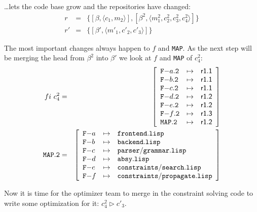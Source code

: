 \documentclass[fleqn, 10pt, a4paper]{article}
\begin{document}
\ldots lets the code base grow and the repositories have changed:
\begin{eqnarray*}
r &=& \{[\beta, \langle c_1, m_2\rangle], [\beta^2, \langle m_1^2, c_2^2,
c_3^2, c_4^2\rangle]\} \\
r' &=& \{[\beta', \langle m'_1, c'_2, c'_3\rangle]\}
\end{eqnarray*}

The most important changes always happen to $f$ and \texttt{MAP}.
As the next step will be merging the head from $\beta^2$ into $\beta'$
we look at $f$ and \texttt{MAP} of $c_4^2$:
\begin{eqnarray*}
\mathnormal{fi}\ c_4^2 &=& \left[
\begin{array}{lcl}
\mathtt{F-}a\mathtt{.2} & \mapsto & \mathsf{r1.1} \\
\mathtt{F-}b\mathtt{.2} & \mapsto & \mathsf{r1.1} \\
\mathtt{F-}c\mathtt{.2} & \mapsto & \mathsf{r1.1} \\
\mathtt{F-}d\mathtt{.2} & \mapsto & \mathsf{r1.2} \\
\mathtt{F-}e\mathtt{.2} & \mapsto & \mathsf{r1.2} \\
\mathtt{F-}f\mathtt{.2} & \mapsto & \mathsf{r1.3} \\
\mathtt{MAP.2}         & \mapsto & \mathsf{r1.2} \\
\end{array}\right] \\
\mathtt{MAP.2} &=& \left[
\begin{array}{lcl}
\mathtt{F-}a &\mapsto& \mathtt{frontend.lisp} \\
\mathtt{F-}b &\mapsto& \mathtt{backend.lisp} \\
\mathtt{F-}c &\mapsto& \mathtt{parser/grammar.lisp} \\
\mathtt{F-}d &\mapsto& \mathtt{absy.lisp} \\
\mathtt{F-}e &\mapsto& \mathtt{constraints/search.lisp} \\
\mathtt{F-}f &\mapsto& \mathtt{constraints/propagate.lisp} \\
\end{array}\right]
\end{eqnarray*}

Now it is time for the optimizer team to merge in the constraint solving
code to write some optimization for it: $c_4^2 \rhd c'_3$.
\end{document}
